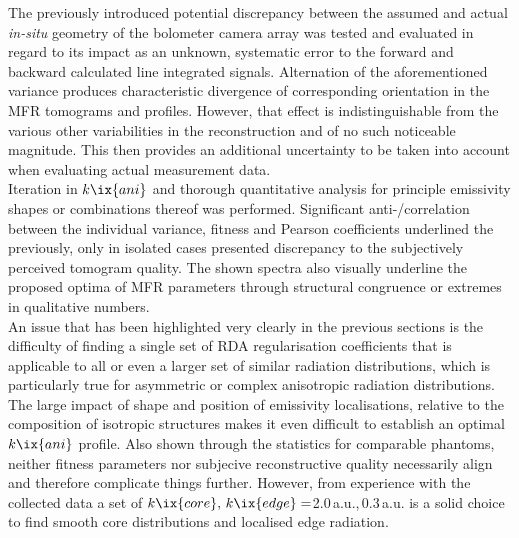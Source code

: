                 The previously introduced potential discrepancy between the assumed and actual \textit{in-situ} geometry of the bolometer camera array was tested and evaluated in regard to its impact as an unknown, systematic error to the forward and backward calculated line integrated signals. Alternation of the aforementioned variance produces characteristic divergence of corresponding orientation in the MFR tomograms and profiles. However, that effect is indistinguishable from the various other variabilities in the reconstruction and of no such noticeable magnitude. This then provides an additional uncertainty to be taken into account when evaluating actual measurement data.\\%
                Iteration in $k\ix{ani}$ and thorough quantitative analysis for principle emissivity shapes or combinations thereof was performed. Significant anti-/correlation between the individual variance, fitness and Pearson coefficients underlined the previously, only in isolated cases presented discrepancy to the subjectively perceived tomogram quality. The shown spectra also visually underline the proposed optima of MFR parameters through structural congruence or extremes in qualitative numbers.\\%
                An issue that has been highlighted very clearly in the previous sections is the difficulty of finding a single set of RDA regularisation coefficients that is applicable to all or even a larger set of similar radiation distributions, which is particularly true for asymmetric or complex anisotropic radiation distributions. The large impact of shape and position of emissivity localisations, relative to the composition of isotropic structures makes it even difficult to establish an optimal $k\ix{ani}$ profile. Also shown through the statistics for comparable phantoms, neither fitness parameters nor subjecive reconstructive quality necessarily align and therefore complicate things further. However, from experience with the collected data a set of $k\ix{core},\,k\ix{edge}=$2.0\,a.u.,\,0.3\,a.u. is a solid choice to find smooth core distributions and localised edge radiation.%
%
